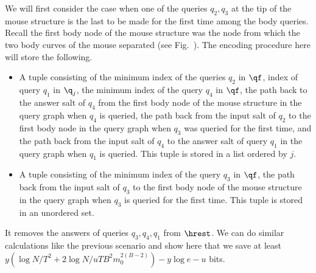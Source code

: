 {
We will first consider the case when one of the queries $q_2,q_3$ at the tip of the mouse structure is the last to be made for the first time among the body queries. Recall the first body node of the mouse structure was the node from which the two body curves of the mouse separated (see Fig.~). The encoding procedure here will store the following.
\begin{itemize}
  \item A tuple consisting of the minimum index of the queries $q_2$ in $\qf$, index of query $q_1$ in $\q_j$, the minimum index of the query $q_4$ in $\qf$, the path back to the answer salt of $q_4$ from the first body node of the mouse structure in the query graph when $q_4$ is queried, the path back from the input salt of $q_2$ to the first body node in the query graph when  $q_3$ was queried for the first time, and the path back from the input salt of $q_4$ to the answer salt of query $q_1$ in the query graph when $q_1$ is queried. This tuple is stored in a list ordered by $j$.
  \item A tuple consisting of the minimum index of the query $q_3$ in $\qf$, the path back from the input salt of $q_3$ to the first body node of the mouse structure in the query graph when $q_3$ is queried for the first time. This tuple is stored in an unordered set.
\end{itemize}
It removes the answers of queries $q_3,q_4,q_1$ from $\hrest$.
We can do similar calculations like the previous scenario and show here that we save at least $y(\log N/T^2 +2\log N/uTB^2m_0^{2(B-2)})- y\log e -u$ bits.

}
